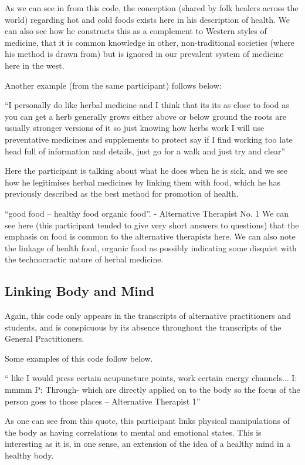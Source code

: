 As we can see in from this code, the conception (shared by folk healers across the world) regarding hot and cold foods exists here in his description of health. We can also see how he constructs this as a complement to Western styles of medicine, that it is common knowledge in other, non-traditional societies (where his method is drawn from) but is ignored in our prevalent system of medicine here in the west. 

Another example (from the same participant) follows below:

``I personally do like herbal medicine and I think that its its as close to food as you can get a herb generally grows either above or below ground the roots are usually stronger versions of it so just knowing how herbs work I will use preventative medicines and supplements to protect say if I find working too late head full of information and details, just go for a walk and just try and clear''

Here the participant is talking about what he does when he is sick, and we see how he legitimises herbal medicines by linking them with food, which he has previously described as the best method for promotion of health. 

``good food – healthy food organic food''. - Alternative Therapist No. 1
We can see here (this participant tended to give very short answers to questions) that the emphasis on food is common to the alternative therapists here. We can also note the linkage of health food, organic food as possibly indicating some disquiet with the technocractic nature of herbal medicine. 

\subsection{Linking Body and Mind}

Again, this code only appears in the transcripts of alternative practitioners and students, and is conspicuous by its absence throughout the transcripts of the General Practitioners. 

Some examples of this code follow below. 

`` like I would press certain acupuncture points, work certain energy channels...
I: mmmm
P: Through- which are directly applied on to the body so the focus of the person goes to those places – Alternative Therapist 1''

As one can see from this quote, this participant links physical manipulations of the body as having correlations to mental and emotional states. This is interesting as it is, in one sense, an extension of the idea of a healthy mind in a healthy body. 

